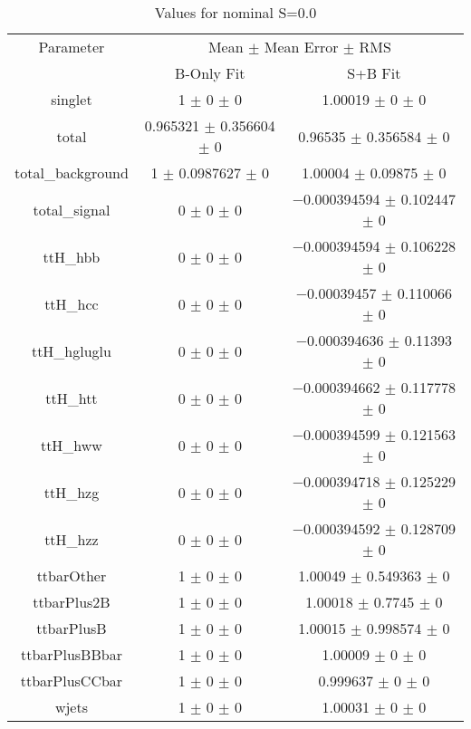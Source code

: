 \begin{table}
\centering
\caption{Values for nominal S=0.0}
\begin{tabular}{ccc}
\toprule
Parameter & \multicolumn{2}{c}{Mean $\pm$ Mean Error $\pm$ RMS}\\
 & B-Only Fit & S+B Fit\\
\midrule
singlet & \num{1} $\pm$ \num{0} $\pm$ \num{0} & \num{1.00019} $\pm$ \num{0} $\pm$ \num{0}\\
total & \num{0.965321} $\pm$ \num{0.356604} $\pm$ \num{0} & \num{0.96535} $\pm$ \num{0.356584} $\pm$ \num{0}\\
total\_background & \num{1} $\pm$ \num{0.0987627} $\pm$ \num{0} & \num{1.00004} $\pm$ \num{0.09875} $\pm$ \num{0}\\
total\_signal & \num{0} $\pm$ \num{0} $\pm$ \num{0} & \num{-0.000394594} $\pm$ \num{0.102447} $\pm$ \num{0}\\
ttH\_hbb & \num{0} $\pm$ \num{0} $\pm$ \num{0} & \num{-0.000394594} $\pm$ \num{0.106228} $\pm$ \num{0}\\
ttH\_hcc & \num{0} $\pm$ \num{0} $\pm$ \num{0} & \num{-0.00039457} $\pm$ \num{0.110066} $\pm$ \num{0}\\
ttH\_hgluglu & \num{0} $\pm$ \num{0} $\pm$ \num{0} & \num{-0.000394636} $\pm$ \num{0.11393} $\pm$ \num{0}\\
ttH\_htt & \num{0} $\pm$ \num{0} $\pm$ \num{0} & \num{-0.000394662} $\pm$ \num{0.117778} $\pm$ \num{0}\\
ttH\_hww & \num{0} $\pm$ \num{0} $\pm$ \num{0} & \num{-0.000394599} $\pm$ \num{0.121563} $\pm$ \num{0}\\
ttH\_hzg & \num{0} $\pm$ \num{0} $\pm$ \num{0} & \num{-0.000394718} $\pm$ \num{0.125229} $\pm$ \num{0}\\
ttH\_hzz & \num{0} $\pm$ \num{0} $\pm$ \num{0} & \num{-0.000394592} $\pm$ \num{0.128709} $\pm$ \num{0}\\
ttbarOther & \num{1} $\pm$ \num{0} $\pm$ \num{0} & \num{1.00049} $\pm$ \num{0.549363} $\pm$ \num{0}\\
ttbarPlus2B & \num{1} $\pm$ \num{0} $\pm$ \num{0} & \num{1.00018} $\pm$ \num{0.7745} $\pm$ \num{0}\\
ttbarPlusB & \num{1} $\pm$ \num{0} $\pm$ \num{0} & \num{1.00015} $\pm$ \num{0.998574} $\pm$ \num{0}\\
ttbarPlusBBbar & \num{1} $\pm$ \num{0} $\pm$ \num{0} & \num{1.00009} $\pm$ \num{0} $\pm$ \num{0}\\
ttbarPlusCCbar & \num{1} $\pm$ \num{0} $\pm$ \num{0} & \num{0.999637} $\pm$ \num{0} $\pm$ \num{0}\\
wjets & \num{1} $\pm$ \num{0} $\pm$ \num{0} & \num{1.00031} $\pm$ \num{0} $\pm$ \num{0}\\
\bottomrule
\end{tabular}
\end{table}